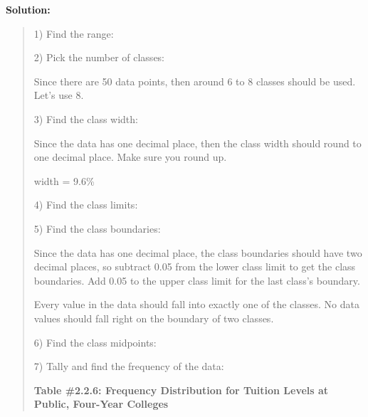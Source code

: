 \documentclass[]{book}
\begin{document}
\textbf{Solution:}

\begin{quote}
1) Find the range:

2) Pick the number of classes:

Since there are 50 data points, then around 6 to 8 classes should be
used. Let's use 8.

3) Find the class width:

Since the data has one decimal place, then the class width should
round to one decimal place. Make sure you round up.

width = 9.6\%

4) Find the class limits:

5) Find the class boundaries:

Since the data has one decimal place, the class boundaries should have
two decimal places, so subtract 0.05 from the lower class limit to get
the class boundaries. Add 0.05 to the upper class limit for the last
class's boundary.

Every value in the data should fall into exactly one of the classes.
No data values should fall right on the boundary of two classes.

6) Find the class midpoints:

7) Tally and find the frequency of the data:

\textbf{Table \#2.2.6: Frequency Distribution for Tuition Levels at Public,
Four-Year Colleges}
\end{quote}
\end{document}
